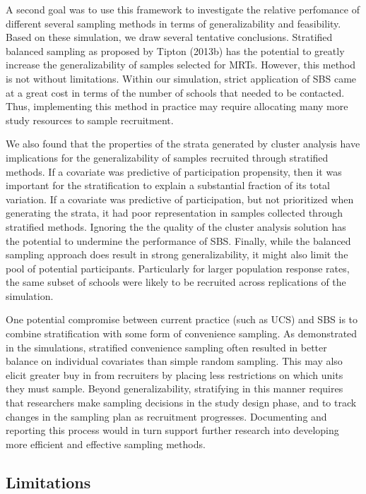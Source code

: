 \documentclass[
  english,
  man,floatsintext]{apa6}
\begin{document}
A second goal was to use this framework to investigate the relative perfomance of different several sampling methods in terms of generalizability and feasibility. Based on these simulation, we draw several tentative conclusions. Stratified balanced sampling as proposed by Tipton (2013b) has the potential to greatly increase the generalizability of samples selected for MRTs. However, this method is not without limitations. Within our simulation, strict application of SBS came at a great cost in terms of the number of schools that needed to be contacted. Thus, implementing this method in practice may require allocating many more study resources to sample recruitment.

We also found that the properties of the strata generated by cluster analysis have implications for the generalizability of samples recruited through stratified methods. If a covariate was predictive of participation propensity, then it was important for the stratification to explain a substantial fraction of its total variation. If a covariate was predictive of participation, but not prioritized when generating the strata, it had poor representation in samples collected through stratified methods. Ignoring the the quality of the cluster analysis solution has the potential to undermine the performance of SBS. Finally, while the balanced sampling approach does result in strong generalizability, it might also limit the pool of potential participants. Particularly for larger population response rates, the same subset of schools were likely to be recruited across replications of the simulation.

One potential compromise between current practice (such as UCS) and SBS is to combine stratification with some form of convenience sampling. As demonstrated in the simulations, stratified convenience sampling often resulted in better balance on individual covariates than simple random sampling. This may also elicit greater buy in from recruiters by placing less restrictions on which units they must sample.
Beyond generalizability, stratifying in this manner requires that researchers make sampling decisions in the study design phase, and to track changes in the sampling plan as recruitment progresses. Documenting and reporting this process would in turn support further research into developing more efficient and effective sampling methods.

\hypertarget{limitations}{%
\subsection{Limitations}\label{limitations}}
\end{document}
